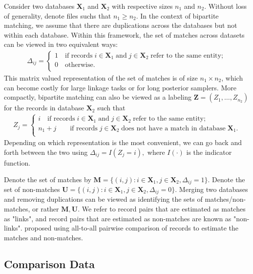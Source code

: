 \documentclass[12pt,letterpaper]{article}
\newcommand{\1}[1]{\mathbb{I}\!\left[#1\right]} %
\begin{document}
{Consider two databases $\bm{X}_1$ and $\bm{X}_2$ with respective sizes $n_1$ and $n_2$. Without loss of generality, denote files suchs that $n_1 \geq n_2$. In the context of bipartite matching, we assume that there are duplications across the databases but not within each database. Within this framework, the set of matches across datasets can be viewed in two equivalent ways: 
\begin{align}
	\Delta_{ij} =
	\begin{cases}
		1 \quad \text{if records}\;  i \in \bm{X}_1 \; \text{and}\; j\in \bm{X}_2 \; \text{refer to the same entity}; \\
		0 \quad \text{otherwise}.\\
	\end{cases}
\end{align}
This matrix valued representation of the set of matches is of size $n_1 \times n_2$, which can become costly for large linkage tasks or for long posterior samplers. More compactly, bipartite matching can also be viewed as a labeling $\bm{Z} = (Z_1, \ldots, Z_{n_2})$ for the records in database $\bm{X}_2$ such that 
\begin{align}
	Z_{j} =
	\begin{cases}
		i \quad \text{if records}\;  i \in \bm{X}_1 \; \text{and}\; j\in \bm{X}_2 \; \text{refer to the same entity}; \\
		n_1 + j \quad  \quad \text{if records}\;  j \in \bm{X}_2 \; \text{does not have a match in database}\; \bm{X}_1. \\
	\end{cases}
\end{align}
Depending on which representation is the most convenient, we can go back and forth between the two using $\Delta_{ij} = I(Z_j = i),$ where $I(\cdot)$ is the indicator function. 

Denote the set of matches by $\bm{M} = \{(i,j): i \in \bm{X}_1, j \in \bm{X}_2, \Delta_{ij} = 1\}.$ Denote the set of non-matches 
$\bm{U} =  \{(i,j): i \in \bm{X}_1, j \in \bm{X}_2, \Delta_{ij} = 0\}.$ Merging two databases and removing 
duplications can be viewed as identifying the sets of matches/non-matches, or rather $\bm{M}, \bm{U}.$ We refer to record pairs that are estimated as matches as "links", and record pairs that are estimated as non-matches are known as "non-links". \cite{fellegi_theory_1969} proposed using all-to-all pairwise comparison of records to estimate the matches and non-matches.

\subsection{Comparison Data}

}
\end{document}
